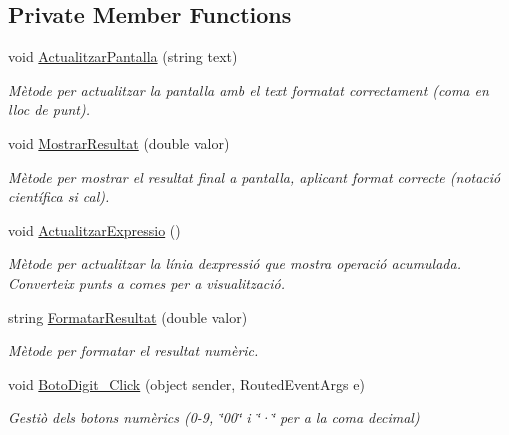 \subsection*{Private Member Functions}
\begin{DoxyCompactItemize}
\item 
void \mbox{\hyperlink{class_p_a_c4___calculadora_1_1_main_window_ac2001931ffe0b6ca6f5128310196cac0}{Actualitzar\+Pantalla}} (string text)
\begin{DoxyCompactList}\small\item\em Mètode per actualitzar la pantalla amb el text formatat correctament (coma en lloc de punt). \end{DoxyCompactList}\item 
void \mbox{\hyperlink{class_p_a_c4___calculadora_1_1_main_window_a514f2c027009dbf5f19ddba53e03f751}{Mostrar\+Resultat}} (double valor)
\begin{DoxyCompactList}\small\item\em Mètode per mostrar el resultat final a pantalla, aplicant format correcte (notació científica si cal). \end{DoxyCompactList}\item 
void \mbox{\hyperlink{class_p_a_c4___calculadora_1_1_main_window_af1208aab8665c6acd9c81811d182a82a}{Actualitzar\+Expressio}} ()
\begin{DoxyCompactList}\small\item\em Mètode per actualitzar la línia d\textquotesingle{}expressió que mostra operació acumulada. Converteix punts a comes per a visualització. \end{DoxyCompactList}\item 
string \mbox{\hyperlink{class_p_a_c4___calculadora_1_1_main_window_a5e7174a57d9b4003763d5c50646e1466}{Formatar\+Resultat}} (double valor)
\begin{DoxyCompactList}\small\item\em Mètode per formatar el resultat numèric. \end{DoxyCompactList}\item 
void \mbox{\hyperlink{class_p_a_c4___calculadora_1_1_main_window_a1d10dfb25aa5485ccb3e129cb4b28994}{Boto\+Digit\+\_\+\+Click}} (object sender, Routed\+Event\+Args e)
\begin{DoxyCompactList}\small\item\em Gestiò dels botons numèrics (0-\/9, \char`\"{}00\char`\"{} i \char`\"{}·\char`\"{} per a la coma decimal) \end{DoxyCompactList}\item 

\end{DoxyCompactItemize}
